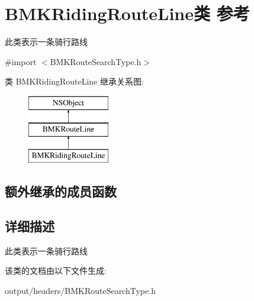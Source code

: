 \hypertarget{interface_b_m_k_riding_route_line}{}\section{B\+M\+K\+Riding\+Route\+Line类 参考}
\label{interface_b_m_k_riding_route_line}


此类表示一条骑行路线  




{\ttfamily \#import $<$B\+M\+K\+Route\+Search\+Type.\+h$>$}

类 B\+M\+K\+Riding\+Route\+Line 继承关系图\+:\begin{figure}[H]
\begin{center}
\leavevmode
\includegraphics[height=3.000000cm]{interface_b_m_k_riding_route_line}
\end{center}
\end{figure}
\subsection*{额外继承的成员函数}


\subsection{详细描述}
此类表示一条骑行路线 

该类的文档由以下文件生成\+:\begin{DoxyCompactItemize}
\item 
output/headers/B\+M\+K\+Route\+Search\+Type.\+h\end{DoxyCompactItemize}

